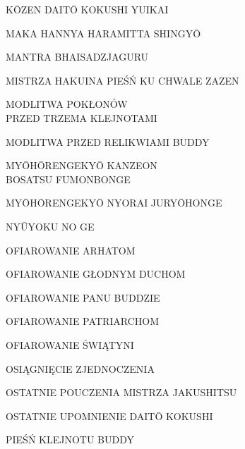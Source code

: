 \par\noindent K\=OZEN DAIT\=O KOKUSHI YUIKAI \dotfill \makebox[1.0cm][r]{\pageref{kozen_daito_kokushi_yuikai}}
\par\noindent MAKA HANNYA HARAMITTA SHINGY\=O \dotfill \makebox[1.0cm][r]{\pageref{hannya_shin_gyo}}
\par\noindent MANTRA BHAISADZJAGURU \dotfill \makebox[1.0cm][r]{\pageref{mantra_bhaisadzjaguru}}
\par\noindent MISTRZA HAKUINA PIEŚŃ KU CHWALE ZAZEN \dotfill \makebox[1.0cm][r]{\pageref{mistrza_hakuina_piesn}}
\par\noindent MODLITWA POKŁONÓW\\ PRZED TRZEMA KLEJNOTAMI \dotfill \makebox[1.0cm][r]{\pageref{trzy_skarby}}
\par\noindent MODLITWA PRZED RELIKWIAMI BUDDY \dotfill \makebox[1.0cm][r]{\pageref{przed_relikwiami}}
\par\noindent MY\=OH\=ORENGEKY\=O KANZEON\\ BOSATSU FUMONBONGE \dotfill \makebox[1.0cm][r]{\pageref{myohorengekyo_kanzeonbosatsu_fumonbonge}}
\par\noindent MY\=OH\=ORENGEKY\=O NYORAI JURY\=OHONGE \dotfill \makebox[1.0cm][r]{\pageref{myohorengekyo_nyorai_juryohonge}}
\par\noindent NY\=UYOKU NO GE \dotfill \makebox[1.0cm][r]{\pageref{nyuyoku_no_ge}}
\par\noindent OFIAROWANIE ARHATOM \dotfill \makebox[1.0cm][r]{\pageref{ofiarowanie_arhatom}}
\par\noindent OFIAROWANIE GŁODNYM DUCHOM \dotfill \makebox[1.0cm][r]{\pageref{ofiarowanie_glodnym_duchom}}
\par\noindent OFIAROWANIE PANU BUDDZIE \dotfill \makebox[1.0cm][r]{\pageref{ofiarowanie_panu_buddzie}}
\par\noindent OFIAROWANIE PATRIARCHOM \dotfill \makebox[1.0cm][r]{\pageref{ofiarowanie_patriarchom}}
\par\noindent OFIAROWANIE ŚWIĄTYNI \dotfill \makebox[1.0cm][r]{\pageref{ofiarowanie_swiatyni}}
\par\noindent OSIĄGNIĘCIE ZJEDNOCZENIA \dotfill \makebox[1.0cm][r]{\pageref{osiagniecie_zjednoczenia}}
\par\noindent OSTATNIE POUCZENIA MISTRZA JAKUSHITSU \dotfill \makebox[1.0cm][r]{\pageref{ostatnie_pouczenia_mistrza_jakushitsu}}
\par\noindent OSTATNIE UPOMNIENIE DAIT\=O KOKUSHI \dotfill \makebox[1.0cm][r]{\pageref{ostatnie_upomnienie}}
\par\noindent PIEŚŃ KLEJNOTU BUDDY \dotfill \makebox[1.0cm][r]{\pageref{piesn_klejnotu_buddy}}

